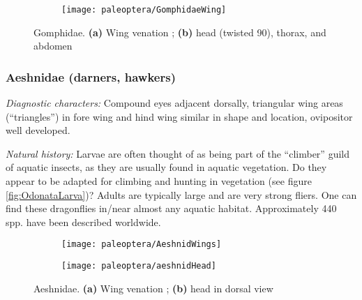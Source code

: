 \begin{figure}[ht!]
    \centering
    \begin{subfigure}[ht!]{0.4\textwidth}
        \texttt{[image: paleoptera/GomphidaeWing]}
        \caption{}
        \label{fig:gomphid1}
    \end{subfigure}
    \hfill
    \begin{subfigure}[ht!]{0.55\textwidth}
        \caption{}
        \label{fig:gomphid2}
    \end{subfigure}
    \caption{Gomphidae. \textbf{(a)} Wing venation \citep[][Fig. 229]{comstock1918wings}; \textbf{(b)} head (twisted 90\textdegree), thorax, and abdomen \citep[redrawn from][Fig. 4:17 f1]{bhlitem126080aquatic}}\label{fig:gomphids} 
\end{figure}

\subsubsection{Aeshnidae (darners, hawkers)}
\noindent{}\textit{Diagnostic characters:} Compound eyes adjacent dorsally, triangular wing areas (``triangles'') in fore wing and hind wing similar in shape and location, ovipositor well developed.\vspace{3mm}

\noindent{}\textit{Natural history:} Larvae are often thought of as being part of the ``climber'' guild of aquatic insects, as they are usually found in aquatic vegetation. Do they appear to be adapted for climbing and hunting in vegetation (see figure \ref{fig:OdonataLarva})? Adults are typically large and are very strong fliers. One can find these dragonflies in/near almost any aquatic habitat. Approximately 440 spp. have been described worldwide.\vspace{3mm}

\begin{figure}[ht!]
    \centering
    \begin{subfigure}[ht!]{0.48\textwidth}
        \texttt{[image: paleoptera/AeshnidWings]}
        \caption{}
        \label{fig:aeshnid1}
    \end{subfigure}
    \hfill
    \begin{subfigure}[ht!]{0.3\textwidth}
        \texttt{[image: paleoptera/aeshnidHead]}
        \caption{}
        \label{fig:aeshnid2}
    \end{subfigure}
    \caption{Aeshnidae. \textbf{(a)} Wing venation \citep[][Fig. 236]{comstock1918wings}; \textbf{(b)} head in dorsal view \citep[][Plate 22, Fig. 3]{aeshnaNorthAmerica}}\label{fig:aeshnids}
\end{figure}


